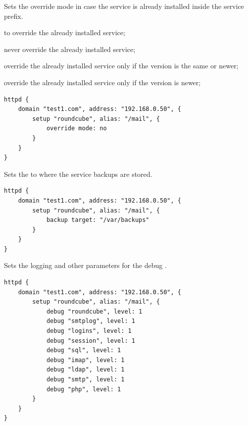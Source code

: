 
Sets the override mode in case the service is already installed inside
the service prefix.
\begin{asparaitem}
\item {} to override the already installed service;
\item {} never override the already installed service;
\item {} override the already installed service only if the version is the same or newer;
\item {} override the already installed service only if the version is newer;
\end{asparaitem}

\begin{lstlisting}[style=Java]
httpd {
    domain "test1.com", address: "192.168.0.50", {
        setup "roundcube", alias: "/mail", {
            override mode: no
        }
    }
}
\end{lstlisting}


Sets the  to where the service backups are stored.

\begin{lstlisting}[style=Java]
httpd {
    domain "test1.com", address: "192.168.0.50", {
        setup "roundcube", alias: "/mail", {
            backup target: "/var/backups"
        }
    }
}
\end{lstlisting}


Sets the logging  and other parameters for the debug .

\begin{lstlisting}[style=Java]
httpd {
    domain "test1.com", address: "192.168.0.50", {
        setup "roundcube", alias: "/mail", {
            debug "roundcube", level: 1
            debug "smtplog", level: 1
            debug "logins", level: 1
            debug "session", level: 1
            debug "sql", level: 1
            debug "imap", level: 1
            debug "ldap", level: 1
            debug "smtp", level: 1
            debug "php", level: 1
        }
    }
}
\end{lstlisting}

